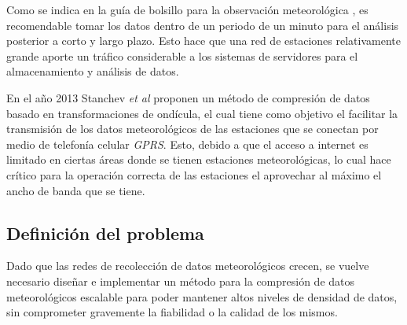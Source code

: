 Como se indica en la guía de bolsillo para la observación meteorológica \cite{Handbook_2000}, es recomendable tomar los datos dentro de un periodo de un minuto para el análisis posterior a corto y largo plazo. Esto hace que una red de estaciones relativamente grande aporte un tráfico considerable a los sistemas de servidores para el almacenamiento y análisis de datos.

En el año 2013 Stanchev \textit{et al} \cite{Improved_Stanchev} proponen un método de compresión de datos basado en transformaciones de ondícula, el cual tiene como objetivo el facilitar la transmisión de los datos meteorológicos de las estaciones que se conectan por medio de telefonía celular \textit{GPRS}. Esto, debido a que el acceso a internet es limitado en ciertas áreas donde se tienen estaciones meteorológicas, lo cual hace crítico para la operación correcta de las estaciones el aprovechar al máximo el ancho de banda que se tiene.

\subsection{Definición del problema}

Dado que las redes de recolección de datos meteorológicos crecen, se vuelve necesario diseñar e implementar un método para la compresión de datos meteorológicos escalable para poder mantener altos niveles de densidad de datos, sin comprometer gravemente la fiabilidad o la calidad de los mismos.
